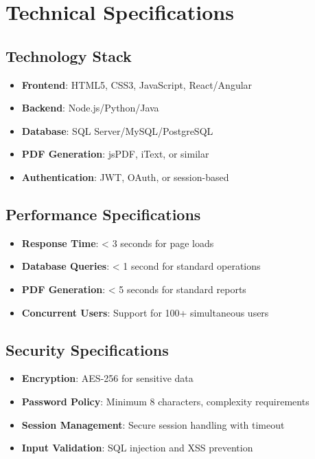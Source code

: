 \documentclass[12pt,a4paper]{article}
\begin{document}
\section{Technical Specifications}

\subsection{Technology Stack}
\begin{itemize}
    \item \textbf{Frontend}: HTML5, CSS3, JavaScript, React/Angular
    \item \textbf{Backend}: Node.js/Python/Java
    \item \textbf{Database}: SQL Server/MySQL/PostgreSQL
    \item \textbf{PDF Generation}: jsPDF, iText, or similar
    \item \textbf{Authentication}: JWT, OAuth, or session-based
\end{itemize}

\subsection{Performance Specifications}
\begin{itemize}
    \item \textbf{Response Time}: < 3 seconds for page loads
    \item \textbf{Database Queries}: < 1 second for standard operations
    \item \textbf{PDF Generation}: < 5 seconds for standard reports
    \item \textbf{Concurrent Users}: Support for 100+ simultaneous users
\end{itemize}

\subsection{Security Specifications}
\begin{itemize}
    \item \textbf{Encryption}: AES-256 for sensitive data
    \item \textbf{Password Policy}: Minimum 8 characters, complexity requirements
    \item \textbf{Session Management}: Secure session handling with timeout
    \item \textbf{Input Validation}: SQL injection and XSS prevention
\end{itemize}
\end{document}
